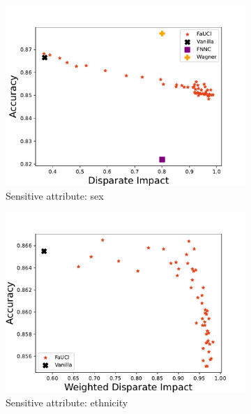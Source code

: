 \begin{figure}
    \begin{subfigure}[]{\onethirdsize}
        \centering
        \includegraphics[width=\columnwidth]{figures/fauci/accuracy/disparate_impact_sex}
        \caption{Sensitive attribute: sex}
        \label{fig:di-sex}
    \end{subfigure}
    \begin{subfigure}[]{\onethirdsize}
        \centering
        \includegraphics[width=\columnwidth]{figures/fauci/accuracy/disparate_impact_ethnicity}
        \caption{Sensitive attribute: ethnicity}
        \label{fig:di-ethnicity}
    \end{subfigure}
    \begin{subfigure}[]{\onethirdsize}

\end{subfigure}
\end{figure}
